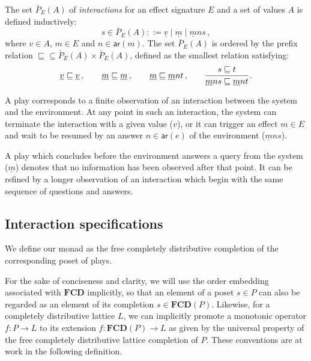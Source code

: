 \documentclass[sigplan,screen]{acmart}
\newcommand{\kw}[1]{\ensuremath{ \mathsf{#1} }}
\begin{document}
\begin{definition}
The set $\bar{P}_E(A)$ of \emph{interactions}
for an effect signature $E$ and a set of values $A$
is defined inductively:
\[
  s \in \bar{P}_E(A) ::=
    \underline{v} \mid
    \underline{m} \mid
    \underline{m} n s \,,
\]
where $v \in A$, $m \in E$ and $n \in \kw{ar}(m)$.
The set $\bar{P}_E(A)$ is ordered by the prefix relation
${\sqsubseteq} \subseteq \bar{P}_E(A) \times \bar{P}_E(A)$,
defined
as the smallest relation satisfying:
\[
  \underline{v} \sqsubseteq \underline{v} \,, \qquad
  \underline{m} \sqsubseteq \underline{m} \,, \qquad
  \underline{m} \sqsubseteq \underline{m} n t \,, \qquad
  \begin{prooftree}
    \hypo{s \sqsubseteq t}
    \infer1{\underline{m} n s \sqsubseteq \underline{m} n t}
  \end{prooftree} \,.
\]
\end{definition}

A play corresponds to a finite observation of
an interaction between the system and the environment.
At any point in such an interaction,
the system can terminate the interaction with a given value ($v$),
or it can trigger an effect $m \in E$ and
wait to be resumed by
an answer $n \in \kw{ar}(e)$ of the environment
($\underline{m} n s$).

A play which concludes before
the environment answers a query from the system ($\underline{m}$)
denotes that no information has been observed after that point.
It can be refined by a longer observation
of an interaction which begin with the same sequence of
questions and answers.


\subsection{Interaction specifications} %

We define our monad as the free completely distributive completion
of the corresponding poset of plays.

For the sake of conciseness and clarity,
we will use the order embedding associated with $\mathbf{FCD}$
implicitly,
so that an element of a poset $s \in P$
can also be regarded as an element of
its completion $s \in \mathbf{FCD}(P)$.
Likewise,
for a completely distributive lattice $L$,
we can implicitly
promote a monotonic operator
$f : P \rightarrow L$
to its extension
$f : \mathbf{FCD}(P) \rightarrow L$
as given by the universal property of
the free completely distributive lattice completion of $P$.
These conventions are at work
in the following definition.
\end{document}
